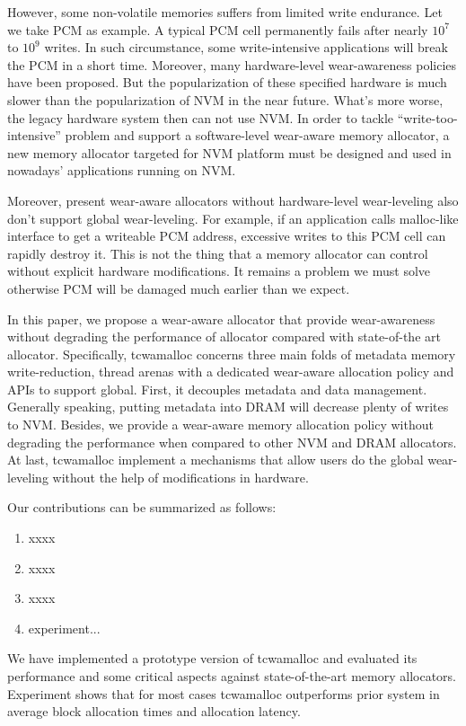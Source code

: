 \documentclass{vldb}
\begin{document}
However, some non-volatile memories suffers from limited write endurance. 
Let we take PCM as example. A typical PCM cell permanently fails after nearly $10^7$ to $10^9$ writes. 
In such circumstance, some write-intensive applications will break the PCM in a short time. 
Moreover, many hardware-level wear-awareness policies have been proposed. 
But the popularization of these specified hardware is much slower than the popularization of NVM in the near future. 
What’s more worse, the legacy hardware system then can not use NVM. 
In order to tackle ``write-too-intensive'' problem and support a software-level wear-aware memory allocator, a new memory allocator targeted for NVM platform must be designed and used in nowadays’ applications running on NVM.

Moreover, present wear-aware allocators without hardware-level wear-leveling also don’t support global wear-leveling. 
For example, if an application calls malloc-like interface to get a writeable PCM address, excessive writes to this PCM cell can rapidly destroy it. 
This is not the thing that a memory allocator can control without explicit hardware modifications. It remains a problem we must solve otherwise PCM will be damaged much earlier than we expect.

In this paper, we propose a wear-aware allocator that provide wear-awareness without degrading the performance of allocator compared with state-of-the art allocator. 
Specifically, tcwamalloc concerns three main folds of metadata memory write-reduction, thread arenas with a dedicated wear-aware allocation policy and APIs to support global. 
First, it decouples metadata and data management. Generally speaking, putting metadata into DRAM will decrease plenty of writes to NVM. 
Besides, we provide a wear-aware memory allocation policy without degrading the performance when compared to other NVM and DRAM allocators. 
At last, tcwamalloc implement a mechanisms that allow users do the global wear-leveling without the help of modifications in hardware.

Our contributions can be summarized as follows:
\begin{enumerate}
    \item xxxx
    \item xxxx
    \item xxxx
    \item experiment...
\end{enumerate}

We have implemented a prototype version of tcwamalloc and evaluated its performance and some critical aspects against state-of-the-art memory allocators. 
Experiment shows that for most cases tcwamalloc outperforms prior system in average block allocation times and allocation latency.
\end{document}
